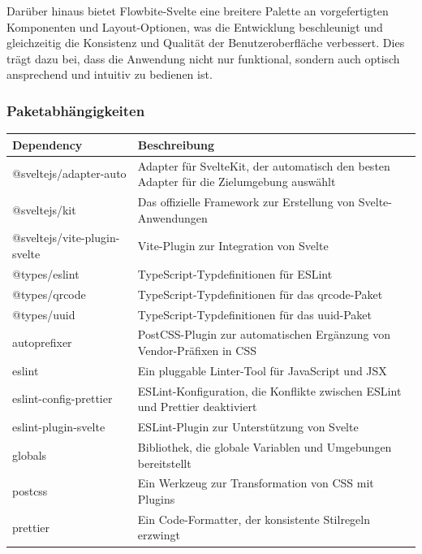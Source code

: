 Darüber hinaus bietet Flowbite-Svelte eine breitere Palette an vorgefertigten Komponenten und Layout-Optionen, was die Entwicklung beschleunigt und gleichzeitig die Konsistenz und Qualität der Benutzeroberfläche verbessert. Dies trägt dazu bei, dass die Anwendung nicht nur funktional, sondern auch optisch ansprechend und intuitiv zu bedienen ist.

\subsubsection{Paketabhängigkeiten}
\label{swentwurf:hunt-editor:dependencies}

\begin{table}[H]
    \centering
    \begin{tabularx}{\textwidth}{|l|X|}
    \hline
    \textbf{Dependency} & \textbf{Beschreibung} \\
    \hline
    @sveltejs/adapter-auto & Adapter für SvelteKit, der automatisch den besten Adapter für die Zielumgebung auswählt \\
    \hline
    @sveltejs/kit & Das offizielle Framework zur Erstellung von Svelte-Anwendungen \\
    \hline
    @sveltejs/vite-plugin-svelte & Vite-Plugin zur Integration von Svelte \\
    \hline
    @types/eslint & TypeScript-Typdefinitionen für ESLint \\
    \hline
    @types/qrcode & TypeScript-Typdefinitionen für das qrcode-Paket \\
    \hline
    @types/uuid & TypeScript-Typdefinitionen für das uuid-Paket \\
    \hline
    autoprefixer & PostCSS-Plugin zur automatischen Ergänzung von Vendor-Präfixen in CSS \\
    \hline
    eslint & Ein pluggable Linter-Tool für JavaScript und JSX \\
    \hline
    eslint-config-prettier & ESLint-Konfiguration, die Konflikte zwischen ESLint und Prettier deaktiviert \\
    \hline
    eslint-plugin-svelte & ESLint-Plugin zur Unterstützung von Svelte \\
    \hline
    globals & Bibliothek, die globale Variablen und Umgebungen bereitstellt \\
    \hline
    postcss & Ein Werkzeug zur Transformation von CSS mit Plugins \\
    \hline
    prettier & Ein Code-Formatter, der konsistente Stilregeln erzwingt \\

\end{tabularx}
\end{table}
